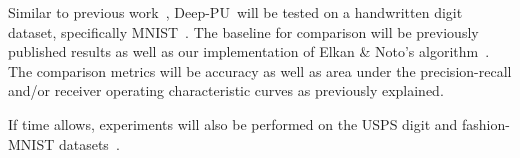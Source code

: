 \documentclass[10pt]{article}
\newcommand{\toolname}{Deep-PU}
\begin{document}
Similar to previous work~\cite{Ghasemi:2016,duPlessis:2014,Claesen:2015}, \toolname\ will be tested on a handwritten digit dataset, specifically MNIST~\cite{LeCun:1999}.  The baseline for comparison will be previously published results as well as our implementation of Elkan \& Noto's algorithm~\cite{Elkan:2008}.  The comparison metrics will be accuracy as well as area under the precision-recall and/or receiver operating characteristic curves as previously explained.

If time allows, experiments will also be performed on the USPS digit and fashion-MNIST datasets~\cite{FashionMNIST}.



\end{document}
